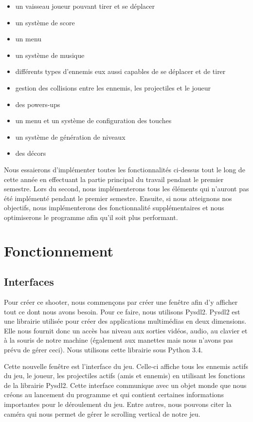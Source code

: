 \documentclass[a4paper, 12pt]{report}
\begin{document}
\begin{itemize}
    \item un vaisseau joueur pouvant tirer et se déplacer
    \item un système de score
    \item un menu
    \item un système de musique
    \item différents types d'ennemis eux aussi capables de se déplacer et de tirer
    \item gestion des collisions entre les ennemis, les projectiles et le joueur
    \item des powers-ups
    \item un menu et un système de configuration des touches
    \item un système de génération de niveaux
    \item des décors
\end{itemize}

\noindent Nous essaierons d'implémenter toutes les fonctionnalités ci-dessus
tout le long de cette année en effectuant la partie principal du travail
pendant le premier semestre. Lors du second, nous implémenterons tous les
éléments qui n'auront pas été implémenté pendant le premier semestre. Ensuite,
si nous atteignons nos objectifs, nous implémenterons des fonctionnalité
supplémentaires et nous optimiserons le programme afin qu'il soit plus
performant.

\chapter{Fonctionnement}
	\section{Interfaces}

Pour créer ce shooter, nous commençons par créer une fenêtre afin d'y afficher
tout ce dont nous avons besoin. Pour ce faire, nous utilisons Pysdl2. Pysdl2
est une librairie utilisée pour créer des applications multimédias en deux
dimensions. Elle nous fournit donc un accès bas niveau aux sorties vidéos,
audio, au clavier et à la souris de notre machine (également aux manettes mais
nous n'avons pas prévu de gérer ceci). Nous utilisons cette librairie sous
Python 3.4. \newline

\noindent Cette nouvelle fenêtre est l'interface du jeu. Celle-ci affiche tous
les ennemis actifs du jeu, le joueur, les projectiles actifs (amis et ennemis)
en utilisant les fonctions de la librairie Pysdl2. Cette interface communique
avec un objet monde que nous créons au lancement du programme et qui contient
certaines informations importantes pour le déroulement du jeu. Entre autres,
nous pouvons citer la caméra qui nous permet de gérer le scrolling vertical de
notre jeu. \newline
\end{document}
